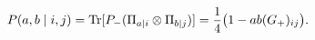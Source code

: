 \setcounter{equation}{41}
\begin{equation}
 P(a,b\mid i,j)=\operatorname{Tr}[P_-(\Pi_{a|i}\otimes\Pi_{b|j})]
 =\frac14\bigl(1-ab(G_+)_{ij}\bigr).
\label{eq:fourcell}
\end{equation}
